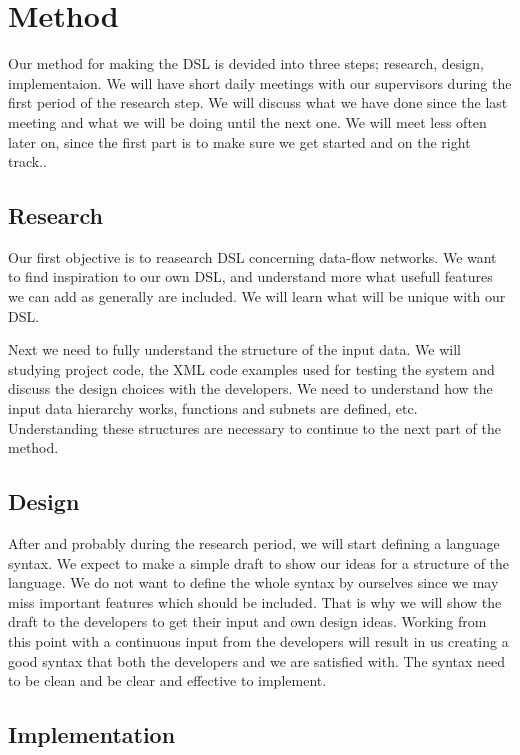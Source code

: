 \documentclass[a4paper]{article}
\begin{document}
\section{Method}
Our method for making the DSL is devided into three steps; research,
design, implementaion. We will have short daily meetings with our
supervisors during the first period of the research step. We will
discuss what we have done since the last meeting and what we will be
doing until the next one. We will meet less often later on, since the
first part is to make sure we get started and on the right track..

\subsection{Research}
Our first objective is to reasearch DSL concerning data-flow
networks. We want to find inspiration to our own DSL, and understand
more what usefull features we can add as generally are included. We
will learn what will be unique with our DSL.

Next we need to fully understand the structure of the input data. We
will studying project code, the XML code examples used for testing the
system and discuss the design choices with the developers. We need to
understand how the input data hierarchy works, functions and subnets
are defined, etc. Understanding these structures are necessary to
continue to the next part of the method.

\subsection{Design}
After and probably during the research period, we will start defining
a language syntax. We expect to make a simple draft to show our ideas
for a structure of the language. We do not want to define the whole
syntax by ourselves since we may miss important features which should
be included. That is why we will show the draft to the developers to
get their input and own design ideas. Working from this point with a
continuous input from the developers will result in us creating a good
syntax that both the developers and we are satisfied with.  The syntax
need to be clean and be clear and effective to implement.

\subsection{Implementation}
\end{document}
